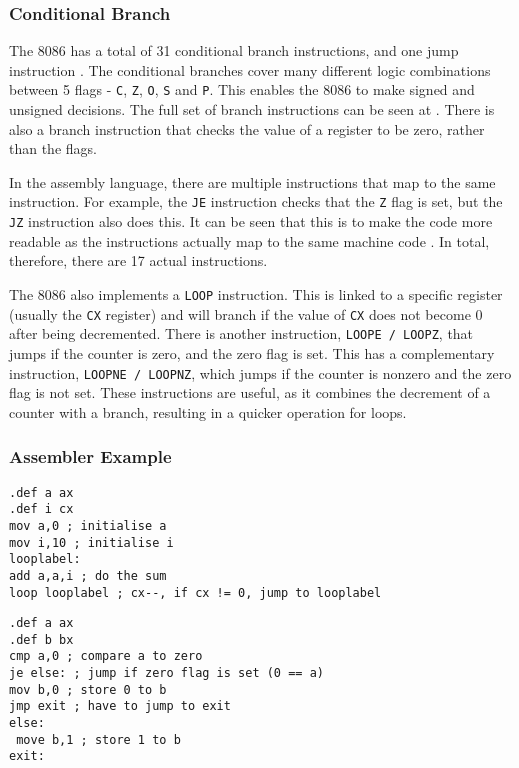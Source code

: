 \documentclass[12pt,a4paper]{article}
\begin{document}
\begin{bibunit}[is-unsrt]
\subsubsection{Conditional Branch}

The 8086 has a total of 31 conditional branch instructions, and one jump instruction \cite{Intel:instructionset}.
The conditional branches cover many different logic combinations between 5 flags - \texttt{C}, \texttt{Z}, \texttt{O}, \texttt{S} and \texttt{P}.
This enables the 8086 to make signed and unsigned decisions.
The full set of branch instructions can be seen at \cite{Intel:condjumps}.
There is also a branch instruction that checks the value of a register to be zero, rather than the flags. 

In the assembly language, there are multiple instructions that map to the same instruction.
For example, the \texttt{JE} instruction checks that the \texttt{Z} flag is set, but the \texttt{JZ} instruction also does this.
It can be seen that this is to make the code more readable as the instructions actually map to the same machine code \cite{Intel:datasheet}.
In total, therefore, there are 17 actual instructions.

The 8086 also implements a \texttt{LOOP} instruction.
This is linked to a specific register (usually the \texttt{CX} register) and will branch if the value of \texttt{CX} does not become $0$ after being decremented.
There is another instruction, \texttt{LOOPE / LOOPZ}, that jumps if the counter is zero, and the zero flag is set. 
This has a complementary instruction, \texttt{LOOPNE / LOOPNZ}, which jumps if the counter is nonzero and the zero flag is not set.
These instructions are useful, as it combines the decrement of a counter with a branch, resulting in a quicker operation for loops.


\subsubsection{Assembler Example}
\begin{lstlisting}[frame=single,caption=Intel 8086 assembler for listing \ref{ListC},label=intel1]
.def a ax
.def i cx
mov a,0 ; initialise a
mov i,10 ; initialise i
looplabel: 
add a,a,i ; do the sum
loop looplabel ; cx--, if cx != 0, jump to looplabel
\end{lstlisting}

\begin{lstlisting}[frame=single,caption=Intel 8086 assembler for listing \ref{ListC2},label=intel2]
.def a ax
.def b bx
cmp a,0 ; compare a to zero
je else: ; jump if zero flag is set (0 == a)
mov b,0 ; store 0 to b
jmp exit ; have to jump to exit
else:
 move b,1 ; store 1 to b
exit:


\end{lstlisting}
\end{bibunit}
\end{document}
